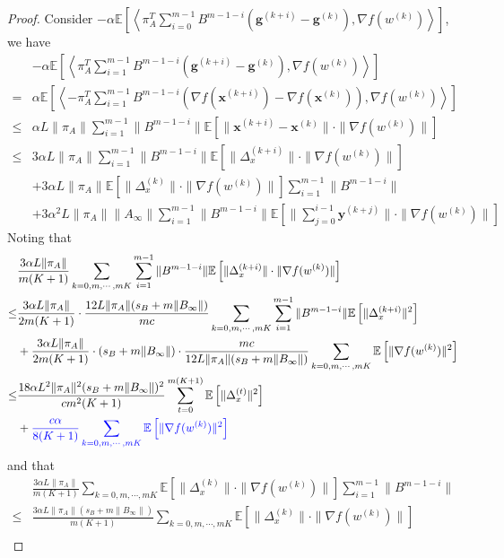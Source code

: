 \documentclass{article}
\newcommand{\vg}{{\mathbf{g}}}
\newcommand{\vx}{{\mathbf{x}}}
\newcommand{\vy}{{\mathbf{y}}}
\newcommand{\EE}[1]{\mathbb{E}\left[#1\right]}
\newcommand{\norm}[1]{\| #1 \|}
\newcommand{\ip}[1]{\left\langle#1\right\rangle}
\begin{document}
\begin{proof}
  Consider $-\alpha\EE{\ip{\pi_A^T\sum_{i=0}^{m-1}B^{m-1-i}(\vg^{(k+i)}-\vg^{(k)}),\nabla f(w^{(k)})}}$,  we have 
  \begin{align*}
    &-\alpha\EE{\ip{\pi_A^T\sum_{i=1}^{m-1}B^{m-1-i}(\vg^{(k+i)}-\vg^{(k)}),\nabla f(w^{(k)})}}\\ 
    =&\alpha\EE{\ip{-\pi_A^T\sum_{i=1}^{m-1}B^{m-1-i}(\nabla f(\vx^{(k+i)})-\nabla f(\vx^{(k)})),\nabla f(w^{(k)})}}\\
    \leq&\alpha L\norm{\pi_A}\sum_{i=1}^{m-1}\norm{B^{m-1-i}}\EE{\norm{\vx^{(k+i)}-\vx^{(k)}}\cdot \norm{\nabla f(w^{(k)})}}\\ 
    \leq&3\alpha L\norm{\pi_A}\sum_{i=1}^{m-1}\norm{B^{m-1-i}}\EE{\norm{\Delta_x^{(k+i)}}\cdot \norm{\nabla f(w^{(k)})}}\\&+3\alpha L\norm{\pi_A}\EE{\norm{\Delta_x^{(k)}}\cdot \norm{\nabla f(w^{(k)})}}\sum_{i=1}^{m-1}\norm{B^{m-1-i}}\\&+3\alpha^2 L\norm{\pi_A}\norm{A_{\infty}}\sum_{i=1}^{m-1}\norm{B^{m-1-i}}\EE{\norm{\sum_{j=0}^{i-1}\vy^{(k+j)}}\cdot \norm{\nabla f(w^{(k)})}}
  \end{align*}
  Noting that 
  \begin{align*}
    &\frac{3\alpha L\norm{\pi_A}}{m(K+1)}\sum_{k=0,m,\cdots,mK}\sum_{i=1}^{m-1}\norm{B^{m-1-i}}\EE{\norm{\Delta_x^{(k+i)}}\cdot \norm{\nabla f(w^{(k)})}}\\ \leq &\frac{3\alpha L \norm{\pi_A}}{2m(K+1)}\cdot\frac{12L\norm{\pi_A}(s_B+m\norm{B_{\infty}})}{mc}\sum_{k=0,m,\cdots,mK}\sum_{i=1}^{m-1}\norm{B^{m-1-i}}\EE{\norm{\Delta_x^{(k+i)}}^2}\\&+\frac{3\alpha L \norm{\pi_A}}{2m(K+1)}\cdot (s_B+m\norm{B_{\infty}})\cdot \frac{mc}{12L\norm{\pi_A}(s_B+m\norm{B_{\infty}})}\sum_{k=0,m,\cdots,mK}\EE{\norm{\nabla f(w^{(k)})}^2}\\
    \leq&\frac{18\alpha L^2\norm{\pi_A}^2(s_B+m\norm{B_{\infty}})^2}{cm^2(K+1)}\sum_{t=0}^{m(K+1)}\EE{\norm{\Delta_x^{(t)}}^2}\\&+\textcolor{blue}{\frac{c\alpha}{8(K+1)}\sum_{k=0,m,\cdots,mK}\EE{\norm{\nabla f(w^{(k)})}^2}}
  \end{align*}
  and that 
  \begin{align*}
    &\frac{3\alpha L\norm{\pi_A}}{m(K+1)}\sum_{k=0,m,\cdots,mK}\EE{\norm{\Delta_x^{(k)}}\cdot \norm{\nabla f(w^{(k)})}}\sum_{i=1}^{m-1}\norm{B^{m-1-i}}\\ \leq&\frac{3\alpha L\norm{\pi_A}(s_B+m\norm{B_{\infty}})}{m(K+1)}\sum_{k=0,m,\cdots,mK}\EE{\norm{\Delta_x^{(k)}}\cdot \norm{\nabla f(w^{(k)})}}\\

\end{align*}
\end{proof}
\end{document}
